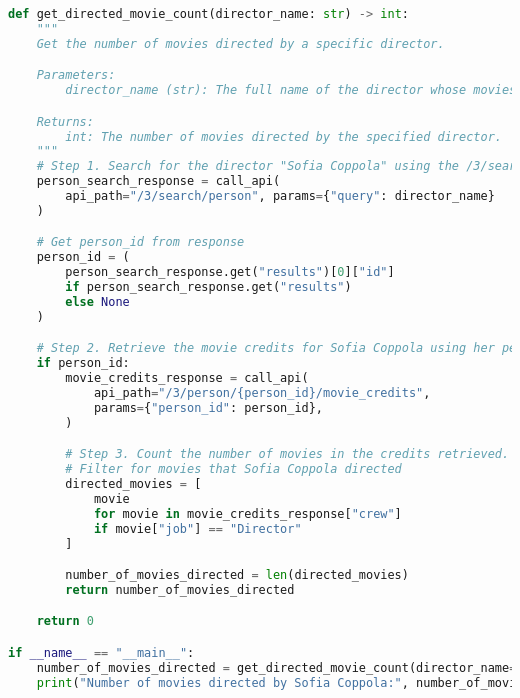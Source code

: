 \begin{figure*}[htbp]
\centering
\begin{lstlisting}[language=python, basicstyle=\ttfamily\tiny]
def get_directed_movie_count(director_name: str) -> int:
    """
    Get the number of movies directed by a specific director.

    Parameters:
        director_name (str): The full name of the director whose movies to count.

    Returns:
        int: The number of movies directed by the specified director.
    """
    # Step 1. Search for the director "Sofia Coppola" using the /3/search/person API to find her person_id.
    person_search_response = call_api(
        api_path="/3/search/person", params={"query": director_name}
    )

    # Get person_id from response
    person_id = (
        person_search_response.get("results")[0]["id"]
        if person_search_response.get("results")
        else None
    )

    # Step 2. Retrieve the movie credits for Sofia Coppola using her person_id with the /3/person/{person_id}/movie_credits API.
    if person_id:
        movie_credits_response = call_api(
            api_path="/3/person/{person_id}/movie_credits",
            params={"person_id": person_id},
        )

        # Step 3. Count the number of movies in the credits retrieved.
        # Filter for movies that Sofia Coppola directed
        directed_movies = [
            movie
            for movie in movie_credits_response["crew"]
            if movie["job"] == "Director"
        ]

        number_of_movies_directed = len(directed_movies)
        return number_of_movies_directed

    return 0

if __name__ == "__main__":
    number_of_movies_directed = get_directed_movie_count(director_name="Sofia Coppola")
    print("Number of movies directed by Sofia Coppola:", number_of_movies_directed)
\end{lstlisting}
\caption{An example of the pseudo-code $c_{\boldsymbol{p}}$ generated by \texttt{ToolCoder} for the query: \textit{give me the number of movies directed by Sofia Coppola}.}
\label{app:planner_example}
\end{figure*}